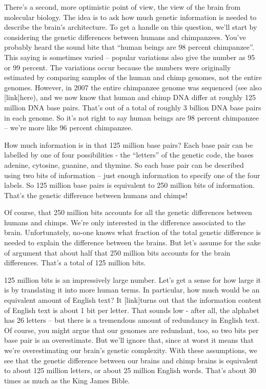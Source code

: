 \documentclass[a4paper,twoside,10pt]{book}
\begin{document}
There's a second, more optimistic point of view, the view of the brain from molecular biology. The idea is to ask how much genetic information is needed to describe the brain's architecture. To get a handle on this question, we'll start by considering the genetic differences between humans and chimpanzees. You've probably heard the sound bite that ``human beings are 98 percent chimpanzee''. This saying is sometimes varied -- popular variations also give the number as 95 or 99 percent. The variations occur because the numbers were originally estimated by comparing samples of the human and chimp genomes, not the entire genomes. However, in 2007 the entire chimpanzee genome was sequenced (see also [link]here), and we now know that human and chimp DNA differ at roughly 125 million DNA base pairs. That's out of a total of roughly 3 billion DNA base pairs in each genome. So it's not right to say human beings are 98 percent chimpanzee -- we're more like 96 percent chimpanzee.

How much information is in that 125 million base pairs? Each base pair can be labelled by one of four possibilities - the ``letters'' of the genetic code, the bases adenine, cytosine, guanine, and thymine. So each base pair can be described using two bits of information -- just enough information to specify one of the four labels. So 125 million base pairs is equivalent to 250 million bits of information. That's the genetic difference between humans and chimps!

Of course, that 250 million bits accounts for all the genetic differences between humans and chimps. We're only interested in the difference associated to the brain. Unfortunately, no-one knows what fraction of the total genetic difference is needed to explain the difference between the brains. But let's assume for the sake of argument that about half that 250 million bits accounts for the brain differences. That's a total of 125 million bits.

125 million bits is an impressively large number. Let's get a sense for how large it is by translating it into more human terms. In particular, how much would be an equivalent amount of English text? It [link]turns out that the information content of English text is about 1 bit per letter. That sounds low - after all, the alphabet has 26 letters -- but there is a tremendous amount of redundancy in English text. Of course, you might argue that our genomes are redundant, too, so two bits per base pair is an overestimate. But we'll ignore that, since at worst it means that we're overestimating our brain's genetic complexity. With these assumptions, we see that the genetic difference between our brains and chimp brains is equivalent to about 125 million letters, or about 25 million English words. That's about 30 times as much as the King James Bible.
\end{document}
